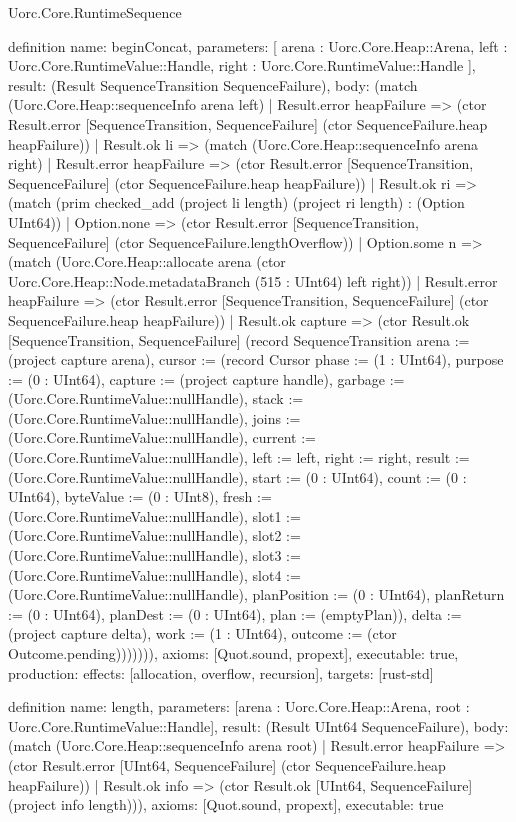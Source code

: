 \begin{lexlean}{Uorc.Core.RuntimeSequence}
\begin{semanticmodule}
definition{
  name: beginConcat,
  parameters: [
    arena : Uorc.Core.Heap::Arena,
    left : Uorc.Core.RuntimeValue::Handle,
    right : Uorc.Core.RuntimeValue::Handle
  ],
  result: (Result SequenceTransition SequenceFailure),
  body: (match (Uorc.Core.Heap::sequenceInfo arena left)
    | Result.error heapFailure => (ctor Result.error [SequenceTransition, SequenceFailure] (ctor SequenceFailure.heap heapFailure))
    | Result.ok li => (match (Uorc.Core.Heap::sequenceInfo arena right)
      | Result.error heapFailure => (ctor Result.error [SequenceTransition, SequenceFailure] (ctor SequenceFailure.heap heapFailure))
      | Result.ok ri => (match (prim checked_add (project li length) (project ri length) : (Option UInt64))
        | Option.none => (ctor Result.error [SequenceTransition, SequenceFailure] (ctor SequenceFailure.lengthOverflow))
        | Option.some n => (match (Uorc.Core.Heap::allocate arena (ctor Uorc.Core.Heap::Node.metadataBranch (515 : UInt64) left right))
          | Result.error heapFailure => (ctor Result.error [SequenceTransition, SequenceFailure] (ctor SequenceFailure.heap heapFailure))
          | Result.ok capture => (ctor Result.ok [SequenceTransition, SequenceFailure] (record SequenceTransition {arena := (project capture arena), cursor := (record Cursor {phase := (1 : UInt64), purpose := (0 : UInt64), capture := (project capture handle), garbage := (Uorc.Core.RuntimeValue::nullHandle), stack := (Uorc.Core.RuntimeValue::nullHandle), joins := (Uorc.Core.RuntimeValue::nullHandle), current := (Uorc.Core.RuntimeValue::nullHandle), left := left, right := right, result := (Uorc.Core.RuntimeValue::nullHandle), start := (0 : UInt64), count := (0 : UInt64), byteValue := (0 : UInt8), fresh := (Uorc.Core.RuntimeValue::nullHandle), slot1 := (Uorc.Core.RuntimeValue::nullHandle), slot2 := (Uorc.Core.RuntimeValue::nullHandle), slot3 := (Uorc.Core.RuntimeValue::nullHandle), slot4 := (Uorc.Core.RuntimeValue::nullHandle), planPosition := (0 : UInt64), planReturn := (0 : UInt64), planDest := (0 : UInt64), plan := (emptyPlan)}), delta := (project capture delta), work := (1 : UInt64), outcome := (ctor Outcome.pending)})))))),
  axioms: [Quot.sound, propext],
  executable: true,
  production: {effects: [allocation, overflow, recursion], targets: [rust-std]}
}

definition{
  name: length,
  parameters: [arena : Uorc.Core.Heap::Arena, root : Uorc.Core.RuntimeValue::Handle],
  result: (Result UInt64 SequenceFailure),
  body: (match (Uorc.Core.Heap::sequenceInfo arena root)
    | Result.error heapFailure => (ctor Result.error [UInt64, SequenceFailure] (ctor SequenceFailure.heap heapFailure))
    | Result.ok info => (ctor Result.ok [UInt64, SequenceFailure] (project info length))),
  axioms: [Quot.sound, propext],
  executable: true
}


\end{semanticmodule}
\end{lexlean}
